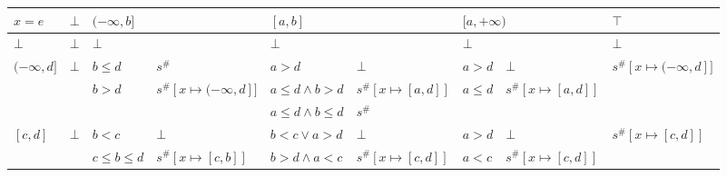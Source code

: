 \documentclass{article}
\begin{document}
\begin{table}[]
    \begin{tabular}{|l|l|ll|ll|ll|l|}
    \hline
    $x = e$                         & $\bot$                  & \multicolumn{2}{l|}{$(-\infty, b]$}                                                & \multicolumn{2}{l|}{$[a, b]$}                                  & \multicolumn{2}{l|}{$[a, +\infty)$}                                          & $\top$                                          \\ \hline
    $\bot$                          & $\bot$                  & \multicolumn{2}{l|}{$\bot$}                                                        & \multicolumn{2}{l|}{$\bot$}                                    & \multicolumn{2}{l|}{$\bot$}                                                  & $\bot$                                          \\ \hline
    \multirow{3}{*}{$(-\infty, d]$} & \multirow{3}{*}{$\bot$} & $b \le d$                        & $s^\#$                                          & $a > d$                             & $\bot$                   & $a > d$                          & $\bot$                                    & \multirow{3}{*}{$s^\#[x \mapsto (-\infty, d]]$} \\
                                    &                         & \multirow{2}{*}{$b > d$}         & \multirow{2}{*}{$s^\#[x \mapsto (-\infty, d]]$} & $a \le d \land b > d$               & $s^\#[x \mapsto [a, d]]$ & \multirow{2}{*}{$a \le d$}       & \multirow{2}{*}{$s^\#[x \mapsto [a, d]]$} &                                                 \\
                                    &                         &                                  &                                                 & $a \le d \land b \le d$             & $s^\#$                   &                                  &                                           &                                                 \\ \hline
    \multirow{5}{*}{$[c, d]$}       & \multirow{5}{*}{$\bot$} & $b < c$                          & $\bot$                                          & $b < c \lor a > d$                  & $\bot$                   & $a > d$                          & $\bot$                                    & \multirow{5}{*}{$s^\#[x \mapsto [c, d]]$}       \\
                                    &                         & \multirow{2}{*}{$c \le b \le d$} & \multirow{2}{*}{$s^\#[x \mapsto [c, b]]$}       & $b > d \land a < c$                 & $s^\#[x \mapsto [c, d]]$ & \multirow{2}{*}{$a < c$}         & \multirow{2}{*}{$s^\#[x \mapsto [c, d]]$} &                                                 \\

\end{tabular}
\end{table}
\end{document}
